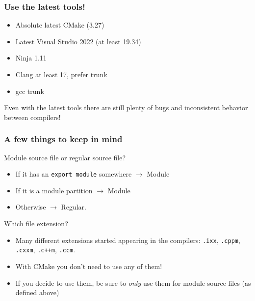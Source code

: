 \documentclass[aspectratio=169]{beamer}
\newif\iftransitions
\newcommand{\cpause}{\iftransitions \pause \fi}
\begin{document}
\begin{frame}
  \frametitle{Use the latest tools!}

  \begin{itemize}
  \item Absolute latest CMake (3.27)
  \item Latest Visual Studio 2022 (at least 19.34)
  \item Ninja 1.11
  \item Clang at least 17, prefer trunk
  \item gcc trunk
  \end{itemize}

  Even with the latest tools there are still plenty of bugs and inconsistent behavior between compilers!
\end{frame}


\begin{frame}[fragile]

  \frametitle{A few things to keep in mind}

  Module source file or regular source file?
  \begin{itemize}
  \item If it has an \texttt{export module} somewhere $\rightarrow$ Module
  \item If it is a module partition $\rightarrow$ Module
  \item Otherwise $\rightarrow$ Regular.
  \end{itemize}

  \cpause
  Which file extension?
  \begin{itemize}
  \item Many different extensions started appearing in the compilers: \texttt{.ixx}, \texttt{.cppm}, \texttt{.cxxm}, \texttt{.c++m}, \texttt{.ccm}.
  \item With CMake you don't need to use any of them!
  \item If you decide to use them, be sure to \textit{only} use them for module source files (as defined above)
  \end{itemize}

\end{frame}

%
\end{document}
